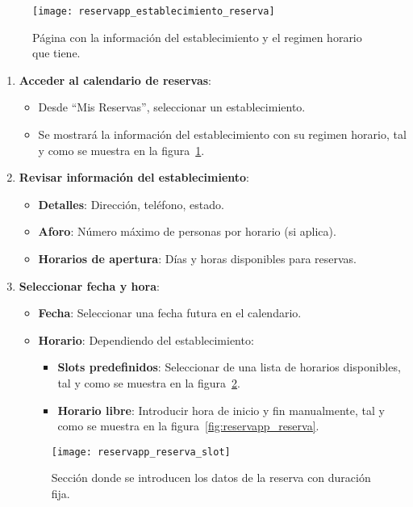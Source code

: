 \begin{figure}[H]
	\centering
		\texttt{[image: reservapp\_establecimiento\_reserva]}
	\caption{Página con la información del establecimiento y el regimen horario que tiene.}
	\label{fig:reservapp_establecimiento_reserva}
\end{figure}

\begin{enumerate}
   \item \textbf{Acceder al calendario de reservas}:
   \begin{itemize}
      \item Desde ``Mis Reservas'', seleccionar un establecimiento.
      \item Se mostrará la información del establecimiento con su regimen horario, tal y como se muestra en la figura~\ref{fig:reservapp_establecimiento_reserva}.
   \end{itemize}
   \item \textbf{Revisar información del establecimiento}:
   \begin{itemize}
      \item \textbf{Detalles}: Dirección, teléfono, estado.
      \item \textbf{Aforo}: Número máximo de personas por horario (si aplica).
      \item \textbf{Horarios de apertura}: Días y horas disponibles para reservas.
   \end{itemize}
   \item \textbf{Seleccionar fecha y hora}:
   \begin{itemize}
      \item \textbf{Fecha}: Seleccionar una fecha futura en el calendario.
      \item \textbf{Horario}: Dependiendo del establecimiento:
      \begin{itemize}
         \item \textbf{Slots predefinidos}: Seleccionar de una lista de horarios disponibles, tal y como se muestra en la figura~\ref{fig:reservapp_reserva_slot}.
         \item \textbf{Horario libre}: Introducir hora de inicio y fin manualmente, tal y como se muestra en la figura~\ref{fig:reservapp_reserva}.
      \end{itemize}
   \end{itemize}

   \begin{figure}[H]
	\centering
		\texttt{[image: reservapp\_reserva\_slot]}
	\caption{Sección donde se introducen los datos de la reserva con duración fija.}
	\label{fig:reservapp_reserva_slot}
   \end{figure}


\end{enumerate}
